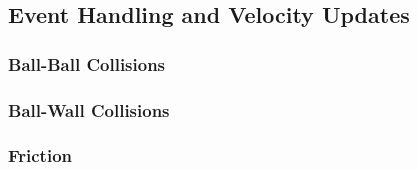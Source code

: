 \documentclass[12pt]{article}
\begin{document}
        \subsection{Event Handling and Velocity Updates}
            \subsubsection{Ball-Ball Collisions}
            
            \subsubsection{Ball-Wall Collisions}
            
            \subsubsection{Friction}
    
\end{document}
